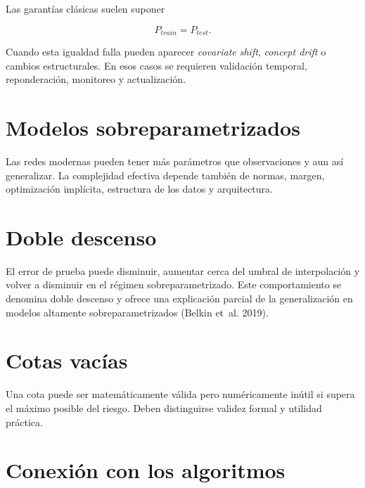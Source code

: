 \documentclass[
  spanish,
  10.5pt,
  letterpaper,
  DIV=11,
  numbers=noendperiod,
  oneside,
  open=any]{scrreprt}
\theoremstyle{definition}
\theoremstyle{definition}
\theoremstyle{plain}
\theoremstyle{remark}
\begin{document}

Las garantías clásicas suelen suponer

\[
P_{train}=P_{test}.
\]

Cuando esta igualdad falla pueden aparecer \emph{covariate shift},
\emph{concept drift} o cambios estructurales. En esos casos se requieren
validación temporal, reponderación, monitoreo y actualización.

\section*{Modelos
sobreparametrizados}\label{modelos-sobreparametrizados}


Las redes modernas pueden tener más parámetros que observaciones y aun
así generalizar. La complejidad efectiva depende también de normas,
margen, optimización implícita, estructura de los datos y arquitectura.

\section*{Doble descenso}\label{doble-descenso}


El error de prueba puede disminuir, aumentar cerca del umbral de
interpolación y volver a disminuir en el régimen sobreparametrizado.
Este comportamiento se denomina doble descenso y ofrece una explicación
parcial de la generalización en modelos altamente sobreparametrizados
(Belkin et~al. 2019).

\section*{Cotas vacías}\label{cotas-vacuxedas}


Una cota puede ser matemáticamente válida pero numéricamente inútil si
supera el máximo posible del riesgo. Deben distinguirse validez formal y
utilidad práctica.

\section*{Conexión con los
algoritmos}\label{conexiuxf3n-con-los-algoritmos}
\end{document}
